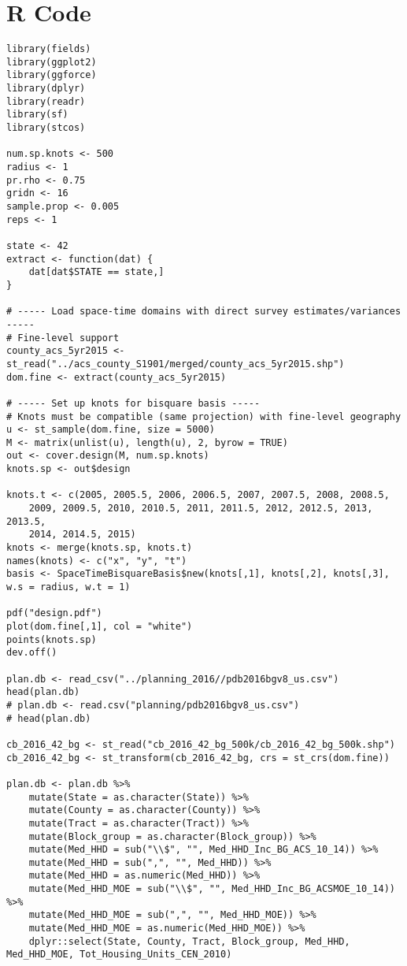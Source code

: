 \documentclass[12pt]{article}
\begin{document}


%

\clearpage

\appendix

\section{R Code}
\label{sec:code}

\begin{scriptsize}
\begin{verbatim}
library(fields)
library(ggplot2)
library(ggforce)
library(dplyr)
library(readr)
library(sf)
library(stcos)

num.sp.knots <- 500
radius <- 1
pr.rho <- 0.75
gridn <- 16
sample.prop <- 0.005
reps <- 1

state <- 42
extract <- function(dat) {
    dat[dat$STATE == state,]
}

# ----- Load space-time domains with direct survey estimates/variances -----
# Fine-level support
county_acs_5yr2015 <- st_read("../acs_county_S1901/merged/county_acs_5yr2015.shp")
dom.fine <- extract(county_acs_5yr2015)

# ----- Set up knots for bisquare basis -----
# Knots must be compatible (same projection) with fine-level geography
u <- st_sample(dom.fine, size = 5000)
M <- matrix(unlist(u), length(u), 2, byrow = TRUE)
out <- cover.design(M, num.sp.knots)
knots.sp <- out$design

knots.t <- c(2005, 2005.5, 2006, 2006.5, 2007, 2007.5, 2008, 2008.5,
    2009, 2009.5, 2010, 2010.5, 2011, 2011.5, 2012, 2012.5, 2013, 2013.5,
    2014, 2014.5, 2015)
knots <- merge(knots.sp, knots.t)
names(knots) <- c("x", "y", "t")
basis <- SpaceTimeBisquareBasis$new(knots[,1], knots[,2], knots[,3], w.s = radius, w.t = 1)

pdf("design.pdf")
plot(dom.fine[,1], col = "white")
points(knots.sp)
dev.off()

plan.db <- read_csv("../planning_2016//pdb2016bgv8_us.csv")
head(plan.db)
# plan.db <- read.csv("planning/pdb2016bgv8_us.csv")
# head(plan.db)

cb_2016_42_bg <- st_read("cb_2016_42_bg_500k/cb_2016_42_bg_500k.shp")
cb_2016_42_bg <- st_transform(cb_2016_42_bg, crs = st_crs(dom.fine))

plan.db <- plan.db %>%
    mutate(State = as.character(State)) %>%
    mutate(County = as.character(County)) %>%
    mutate(Tract = as.character(Tract)) %>%
    mutate(Block_group = as.character(Block_group)) %>%
    mutate(Med_HHD = sub("\\$", "", Med_HHD_Inc_BG_ACS_10_14)) %>%
    mutate(Med_HHD = sub(",", "", Med_HHD)) %>%
    mutate(Med_HHD = as.numeric(Med_HHD)) %>%
    mutate(Med_HHD_MOE = sub("\\$", "", Med_HHD_Inc_BG_ACSMOE_10_14)) %>%
    mutate(Med_HHD_MOE = sub(",", "", Med_HHD_MOE)) %>%
    mutate(Med_HHD_MOE = as.numeric(Med_HHD_MOE)) %>%
    dplyr::select(State, County, Tract, Block_group, Med_HHD, Med_HHD_MOE, Tot_Housing_Units_CEN_2010)


\end{verbatim}
\end{scriptsize}
\end{document}
